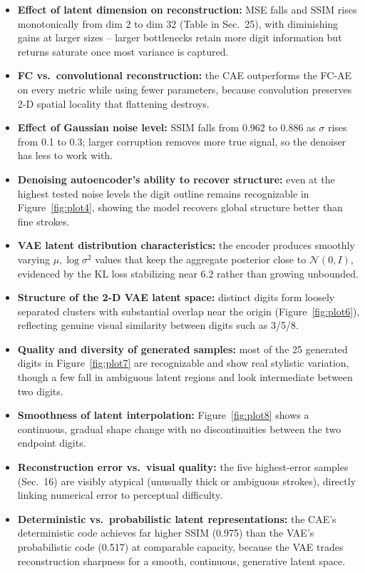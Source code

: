 \documentclass[10pt]{article}
\begin{document}
\begin{itemize}
\item \textbf{Effect of latent dimension on reconstruction:} MSE falls and SSIM rises monotonically from
dim 2 to dim 32 (Table in Sec.~25), with diminishing gains at larger sizes -- larger bottlenecks retain
more digit information but returns saturate once most variance is captured.
\item \textbf{FC vs.\ convolutional reconstruction:} the CAE outperforms the FC-AE on every metric while
using fewer parameters, because convolution preserves 2-D spatial locality that flattening destroys.
\item \textbf{Effect of Gaussian noise level:} SSIM falls from 0.962 to 0.886 as $\sigma$ rises from 0.1
to 0.3; larger corruption removes more true signal, so the denoiser has less to work with.
\item \textbf{Denoising autoencoder's ability to recover structure:} even at the highest tested noise
levels the digit outline remains recognizable in Figure~\ref{fig:plot4}, showing the model recovers global structure
better than fine strokes.
\item \textbf{VAE latent distribution characteristics:} the encoder produces smoothly varying $\mu,
\log\sigma^2$ values that keep the aggregate posterior close to $\mathcal{N}(0,I)$, evidenced by the KL
loss stabilizing near 6.2 rather than growing unbounded.
\item \textbf{Structure of the 2-D VAE latent space:} distinct digits form loosely separated clusters
with substantial overlap near the origin (Figure~\ref{fig:plot6}), reflecting genuine visual similarity between digits
such as 3/5/8.
\item \textbf{Quality and diversity of generated samples:} most of the 25 generated digits in Figure~\ref{fig:plot7}
are recognizable and show real stylistic variation, though a few fall in ambiguous latent regions and
look intermediate between two digits.
\item \textbf{Smoothness of latent interpolation:} Figure~\ref{fig:plot8} shows a continuous, gradual shape change with
no discontinuities between the two endpoint digits.
\item \textbf{Reconstruction error vs.\ visual quality:} the five highest-error samples (Sec.~16) are
visibly atypical (unusually thick or ambiguous strokes), directly linking numerical error to perceptual
difficulty.
\item \textbf{Deterministic vs.\ probabilistic latent representations:} the CAE's deterministic code
achieves far higher SSIM (0.975) than the VAE's probabilistic code (0.517) at comparable capacity,
because the VAE trades reconstruction sharpness for a smooth, continuous, generative latent space.
\end{itemize}
\end{document}
